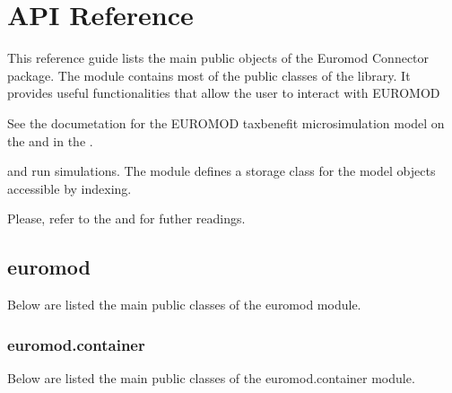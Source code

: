 \documentclass[letterpaper,10pt,english]{sphinxmanual}
\begin{document}
\section{API Reference}
\label{\detokenize{autoapi/index:api-reference}}\label{\detokenize{autoapi/index::doc}}
\sphinxAtStartPar
This reference guide lists the main public objects of the Euromod Connector package.
The  module contains most of the public classes of the library.
It provides useful functionalities that allow the user to interact with EUROMOD %
\begin{footnote}[1]\sphinxAtStartFootnote
See the documetation for the EUROMOD tax\sphinxhyphen{}benefit microsimulation model on the  and in the .
%
\end{footnote} and run simulations.
The  module defines a storage class for the model objects accessible by indexing.

\sphinxAtStartPar
Please, refer to the  and  for futher readings.

\sphinxstepscope


\subsection{euromod}
\label{\detokenize{autoapi/euromod/index:module-euromod}}\label{\detokenize{autoapi/euromod/index:euromod}}\label{\detokenize{autoapi/euromod/index::doc}}
\sphinxAtStartPar
Below are listed the main public classes of the euromod module.

\sphinxstepscope


\subsubsection{euromod.container}
\label{\detokenize{autoapi/euromod/container/index:module-euromod.container}}\label{\detokenize{autoapi/euromod/container/index:euromod-container}}\label{\detokenize{autoapi/euromod/container/index::doc}}
\sphinxAtStartPar
Below are listed the main public classes of the euromod.container module.
\end{document}

